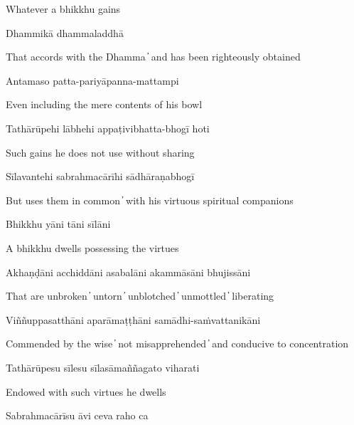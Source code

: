 \begin{cprenglish}
  Whatever a bhikkhu gains
\end{cprenglish}

Dhammikā dhammaladdhā

\begin{cprenglish}
  That accords with the Dhamma  ̓  and has been righteously obtained
\end{cprenglish}

Antamaso patta-pariyāpanna-mattampi

\begin{cprenglish}
  Even including the mere contents of his bowl
\end{cprenglish}

Tathārūpehi lābhehi appaṭivibhatta-bhogī hoti

\begin{cprenglish}
  Such gains he does not use without sharing
\end{cprenglish}

Sīlavantehi sabrahmacārīhi sādhāraṇabhogī

\begin{cprenglish}
  But uses them in common  ̓  with his virtuous spiritual companions
\end{cprenglish}

Bhikkhu yāni tāni sīlāni

\begin{cprenglish}
  A bhikkhu dwells possessing the virtues
\end{cprenglish}

Akhaṇḍāni acchiddāni asabalāni akammāsāni bhujissāni

\begin{cprenglish}
  That are unbroken  ̓  untorn  ̓  unblotched  ̓  unmottled  ̓  liberating
\end{cprenglish}

Viññuppasatthāni aparāmaṭṭhāni samādhi-saṁvattanikāni

\begin{cprenglish}
  Commended by the wise  ̓  not misapprehended  ̓  and conducive to concentration
\end{cprenglish}

Tathārūpesu sīlesu sīlasāmaññagato viharati

\begin{cprenglish}
  Endowed with such virtues he dwells
\end{cprenglish}

Sabrahmacārīsu āvi ceva raho ca

